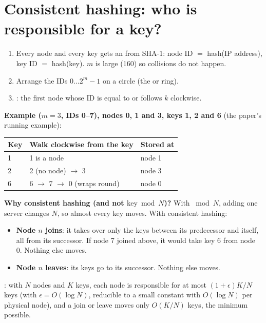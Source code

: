 \section{Consistent hashing: who is responsible for a key?}

\begin{enumerate}
  \item Every node and every key gets an  from SHA-1: node ID $=$ hash(IP address), key ID $=$ hash(key). $m$ is
        large (160) so collisions do not happen.
  \item Arrange the IDs $0 \dots 2^m - 1$ on a circle (the  or ring).
  \item {}: the first node whose ID is equal to or follows $k$ clockwise.
\end{enumerate}

\textbf{Example ($m = 3$, IDs 0--7), nodes 0, 1 and 3, keys 1, 2 and 6} (the paper's running example):
\begin{center}
\begin{tabular}{@{}lll@{}}
\toprule
Key & Walk clockwise from the key & Stored at\\
\midrule
1 & 1 is a node & node 1\\
2 & 2 (no node) $\to$ 3 & node 3\\
6 & 6 $\to$ 7 $\to$ 0 (wraps round) & node 0\\
\bottomrule
\end{tabular}
\end{center}

\textbf{Why consistent hashing (and not $\text{key} \bmod N$)?} With $\bmod N$, adding one server changes $N$, so almost every key moves. With
consistent hashing:
\begin{itemize}
  \item \textbf{Node $n$ joins}: it takes over only the keys between its predecessor and itself, all from its successor. If node 7 joined above, it
        would take key 6 from node 0. Nothing else moves.
  \item \textbf{Node $n$ leaves}: its keys go to its successor. Nothing else moves.
\end{itemize}
: with $N$ nodes and $K$ keys, each node is responsible for at most $(1 + \epsilon)K/N$ keys (with $\epsilon = O(\log N)$, reducible to
a small constant with $O(\log N)$  per physical node), and a join or leave moves only $O(K/N)$ keys, the minimum possible.


